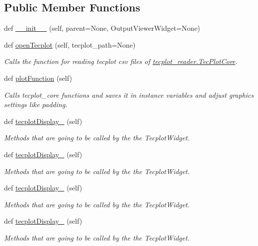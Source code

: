 \subsection*{Public Member Functions}
\begin{DoxyCompactItemize}
\item 
def \hyperlink{a00110_abc270dcf6e8aaa3a645ae0258c4a9e5e}{\+\_\+\+\_\+init\+\_\+\+\_\+} (self, parent=None, Output\+Viewer\+Widget=None)
\item 
def \hyperlink{a00110_a6b4350a2c6ee537dba6bbe1549778636}{open\+Tecplot} (self, tecplot\+\_\+path=None)
\begin{DoxyCompactList}\small\item\em Calls the function for reading tecplot csv files of \hyperlink{a00118}{tecplot\+\_\+reader.\+Tec\+Plot\+Core}. \end{DoxyCompactList}\item 
def \hyperlink{a00110_a62c9724fbeda8d8780e57559bada3282}{plot\+Function} (self)
\begin{DoxyCompactList}\small\item\em Calls tecplot\+\_\+core functions and saves it in instance variables and adjust graphics settings like padding. \end{DoxyCompactList}\item 
def \hyperlink{a00110_ae792d997329b65cfed0b8a0a5feaa1a2}{tecplot\+Display\+\_} (self)
\begin{DoxyCompactList}\small\item\em Methods that are going to be called by the the Tecplot\+Widget. \end{DoxyCompactList}\item 
def \hyperlink{a00110_aec1f3f862b488e5f66161ca7241908c1}{tecplot\+Display\+\_} (self)
\begin{DoxyCompactList}\small\item\em Methods that are going to be called by the the Tecplot\+Widget. \end{DoxyCompactList}\item 
def \hyperlink{a00110_ae29c235476c3ca1ff19f4b933b86ed86}{tecplot\+Display\+\_} (self)
\begin{DoxyCompactList}\small\item\em Methods that are going to be called by the the Tecplot\+Widget. \end{DoxyCompactList}\item 
def \hyperlink{a00110_acdc9dc387494507084a2ab2cc0c8d9ac}{tecplot\+Display\+\_} (self)
\begin{DoxyCompactList}\small\item\em Methods that are going to be called by the the Tecplot\+Widget. \end{DoxyCompactList}\item 

\end{DoxyCompactItemize}
